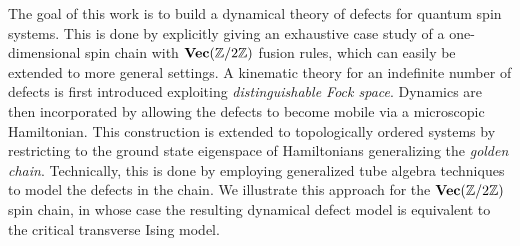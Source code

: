 The goal of this work is to build a dynamical theory of defects for quantum spin systems. This is done by explicitly giving an exhaustive case study of a one-dimensional spin chain with $\textbf{Vec}(\mathbb{Z}/2\mathbb{Z})$ fusion rules, which can easily be extended to more general settings. A kinematic theory for an indefinite number of defects is first introduced exploiting \emph{distinguishable Fock space}. Dynamics are then incorporated by allowing the defects to become mobile via a microscopic Hamiltonian. This construction is extended to topologically ordered systems by restricting to the ground state eigenspace of Hamiltonians generalizing the \emph{golden chain}. Technically, this is done by employing generalized tube algebra techniques to model the defects in the chain. We illustrate this approach for the $\textbf{Vec}(\mathbb{Z}/2\mathbb{Z})$ spin chain, in whose case the resulting dynamical defect model is equivalent to the critical transverse Ising model.